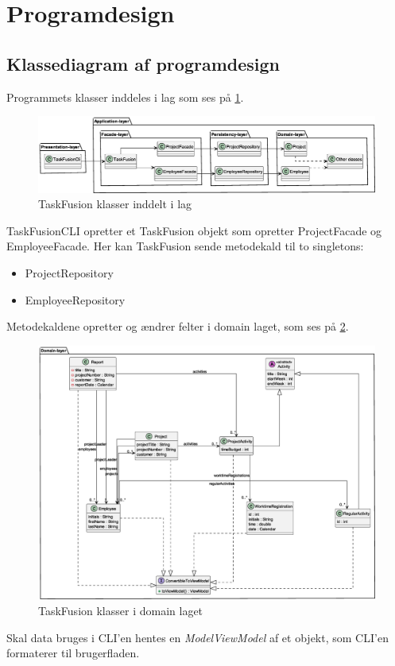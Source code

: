 \section{Programdesign}
\subsection{Klassediagram af programdesign}
Programmets klasser inddeles i lag som ses på \cref{fig:classLayers}.
\begin{figure}
    \centering
    \caption{TaskFusion klasser inddelt i lag}\label{fig:classLayers}
    \includegraphics[width=\textwidth]{TaskFusion/out/assets/diagrams/class_persistency_layer/ClassDiagram_layer.eps}
\end{figure}
TaskFusionCLI opretter et TaskFusion objekt som opretter ProjectFacade og EmployeeFacade. Her kan TaskFusion sende metodekald til to singletons:
\begin{itemize}
    \item ProjectRepository
    \item EmployeeRepository
\end{itemize}
Metodekaldene opretter og ændrer felter i domain laget, som ses på \cref{fig:domainLayer}.
\begin{figure}
    \centering
    \caption{TaskFusion klasser i domain laget}\label{fig:domainLayer}
    \includegraphics[width=\textwidth]{TaskFusion/out/assets/diagrams/class_persistency_domain/ClassDiagram_domain.eps}
\end{figure}
Skal data bruges i CLI'en hentes en \textit{ModelViewModel} af et objekt, som CLI'en formaterer til brugerfladen.
